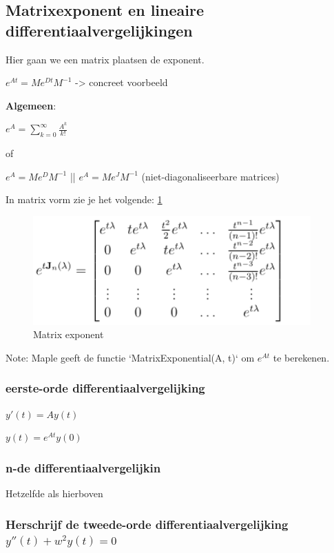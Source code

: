 \documentclass[a4paper]{article}
\begin{document}
\subsection{Matrixexponent en lineaire differentiaalvergelijkingen}

Hier gaan we een matrix plaatsen de exponent.

$e^{At} = M e^{Dt} M^{-1}$ -> concreet voorbeeld

\textbf{Algemeen}:

$e^{A} = \sum_{k=0}^{\infty} \frac{A^k}{k!}$

of

$e^{A} = M e^{D} M^{-1}$ || $e^{A} = M e^{J} M^{-1}$ (niet-diagonaliseerbare matrices)

In matrix vorm zie je het volgende: \ref{fig:matrix_expo}

\begin{figure}[htbp!]
	\begin{center}
		\includegraphics[width=0.95\textwidth]{./images/matrix_expo.png}
	\end{center}
	\caption{Matrix exponent}
	\label{fig:matrix_expo}
\end{figure}

Note: Maple geeft de functie `MatrixExponential(A, t)` om $e^{At}$ te berekenen.

\subsubsection{eerste-orde differentiaalvergelijking}

$y'(t) = Ay(t)$

$y(t) = e^{At} y(0)$

\subsubsection{n-de differentiaalvergelijkin}

Hetzelfde als hierboven

\subsubsection{Herschrijf de tweede-orde differentiaalvergelijking $y''(t) + w^2 y(t) = 0$}
\end{document}
